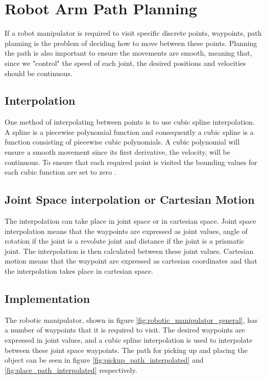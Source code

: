 \section*{Robot Arm Path Planning} 



If a robot manipulator is required to visit specific discrete points, waypoints, path planning is the problem of deciding how to move between these points. Planning the path is also important to ensure the movements are smooth, meaning that, since we "control" the speed of each joint, the desired positions and velocities should be continuous.
\subsection*{Interpolation}
One method of interpolating between points is to use cubic spline interpolation. A spline \cite{spline_wolfram} is a piecewise polynomial function and consequently a cubic spline is a function consisting of piecewise cubic polynomials. A cubic polynomial will ensure a smooth movement since its first derivative, the velocity, will be continuous. To ensure that each required point is visited the bounding values for each cubic function are set to zero \cite{cubic_spline_wolfram}.

\subsection*{Joint Space interpolation or Cartesian Motion}
The interpolation can take place in joint space or in cartesian space. Joint space interpolation means that the waypoints are expressed as joint values, angle of rotation if the joint is a revolute joint and distance if the joint is a prismatic joint.
The interpolation is then calculated between these joint values. Cartesian motion means that the waypoint are expressed as cartesian coordinates and that the interpolation takes place in cartesian space.

\subsection*{Implementation} %
The robotic manipulator, shown in figure \ref{fig:robotic_manipulator_general}, has a number of waypoints that it is required to visit. The desired waypoints are expressed in joint values, and a cubic spline interpolation is used to interpolate between these joint space waypoints. The path for picking up and placing the object can be seen in figure \ref{fig:pickup_path_interpolated} and \ref{fig:place_path_interpolated} respectively.


